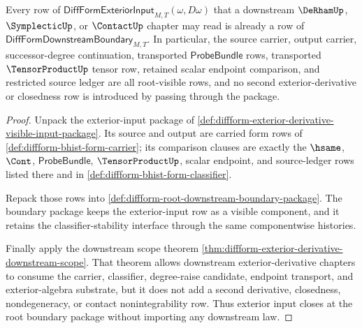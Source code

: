 \begin{theorem}
\label{thm:diffform-exterior-input-root-closure}
Every row of
$\mathsf{DiffFormExteriorInput}_{M,T}(\omega,D\omega)$ that a downstream
$\DeRhamUp$, $\SymplecticUp$, or $\ContactUp$ chapter may read is already a
row of $\mathsf{DiffFormDownstreamBoundary}_{M,T}$. In particular, the
source carrier, output carrier, successor-degree continuation, transported
$\mathsf{ProbeBundle}$ rows, transported $\TensorProductUp$ tensor row,
retained scalar endpoint comparison, and restricted source ledger are all
root-visible rows, and no second exterior-derivative or closedness row is
introduced by passing through the package.
\end{theorem}
\begin{proof}
Unpack the exterior-input package of
\autoref{def:diffform-exterior-derivative-visible-input-package}. Its source
and output are carried form rows of
\autoref{def:diffform-bhist-form-carrier}; its comparison clauses are exactly
the $\hsame$, $\Cont$, $\mathsf{ProbeBundle}$, $\TensorProductUp$, scalar
endpoint, and source-ledger rows listed there and in
\autoref{def:diffform-bhist-form-classifier}.

Repack those rows into
\autoref{def:diffform-root-downstream-boundary-package}. The boundary package
keeps the exterior-input row as a visible component, and it retains the
classifier-stability interface through the same componentwise histories.

Finally apply the downstream scope theorem
\autoref{thm:diffform-exterior-derivative-downstream-scope}. That theorem
allows downstream exterior-derivative chapters to consume the carrier,
classifier, degree-raise candidate, endpoint transport, and exterior-algebra
substrate, but it does not add a second derivative, closedness, nondegeneracy,
or contact nonintegrability row. Thus exterior input closes at the root
boundary package without importing any downstream law.
\end{proof}


